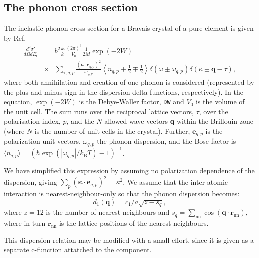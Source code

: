 \subsection{The phonon cross section} %
The inelastic phonon cross section for a Bravais crystal of a pure element
is given by Ref.~\cite[ch.3~]{squires}
\begin{eqnarray}
\frac{d^2\sigma'}{d\Omega dE_\textrm{f}} &=&
  b^2 \frac{k_\textrm{f}}{k_\textrm{i}} \frac{(2\pi)^3}{V_0}\frac{1}{2M} \exp(-2W) \nonumber \\
&\times&
  \sum_{\tau,q,p} \frac{(\boldsymbol{\kappa} \cdot \textbf{e}_{q,p})^2}
                       {\omega_{q,p}}
  \left\langle n_{q,p} + \frac{1}{2} \mp \frac{1}{2} \right\rangle
  \delta(\omega\pm\omega_{q,p}) \delta(\kappa\pm\textbf{q}-\tau) ,
\end{eqnarray}
where both annihilation and creation of one phonon is considered
(represented by the plus and minus sign in the dispersion delta functions,
respectively).
In the equation,
$\exp(-2W)$ is the Debye-Waller factor, \verb+DW+ and
$V_0 $ is the volume of the unit cell.
The sum runs over the reciprocal lattice vectors, $\tau$,
over the polarisation index, $p$,
and the $N$ allowed wave vectors \textbf{q} within the Brillouin zone
(where $N$ is the number of unit cells in the crystal).
Further, $\textbf{e}_{q,p}$ is the
polarization unit vectors, $\omega_{q,p}$ the phonon dispersion,
and the Bose factor is
$\langle n_{q,p} \rangle = (\hbar \exp(|\omega_{q,p}|/k_\textrm{B}T)-1)^{-1}$.

We have simplified this expression by assuming no polarization
dependence of the dispersion, giving
$\sum_{p} (\boldsymbol{\kappa} \cdot \textbf{e}_{q,p})^2 = \kappa^2$.
We assume that the inter-atomic interaction is nearest-neighbour-only
so that the phonon dispersion becomes:
\begin{equation}
d_1(\textbf{q}) = c_1/a \sqrt{z-s_q} ,
\end{equation}
where $z=12$ is the number of nearest neighbours and
$s_q=\sum_\textrm{nn} \cos(\textbf{q} \cdot \textbf{r}_\textrm{nn})$,
where in turn $\textbf{r}_\textrm{nn}$ is the lattice positions of the
nearest neighbours.

This dispersion relation may be modified with a small effort,
since it is given as a separate c-function attatched to the component.


